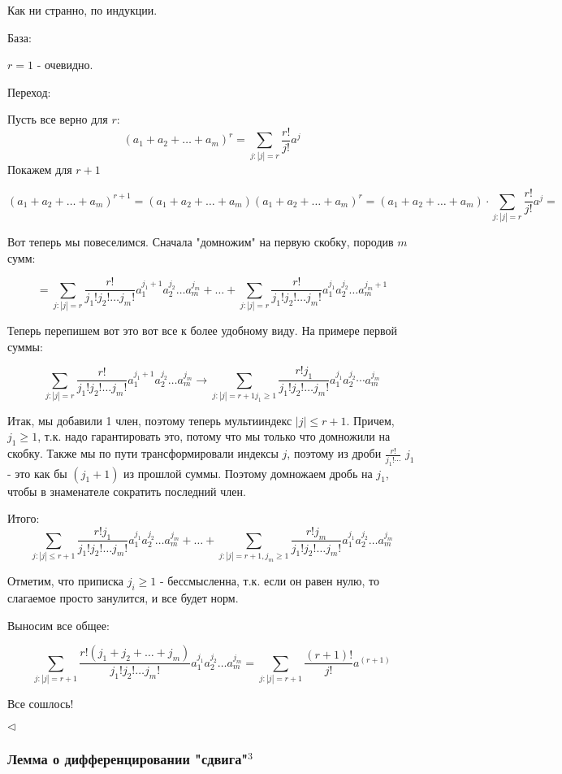 \documentclass{article}
\begin{document}
Как ни странно, по индукции.

База:

$r = 1$ - очевидно.

Переход:

Пусть все верно для $r$: 
$$
(a_1 + a_2 + \dots + a_m)^r = \sum_{j: |j| = r} \frac {r!}{j!} a^j
$$
Покажем для $r + 1$

$$
(a_1 + a_2 + \dots + a_m)^{r+1} = (a_1 + a_2 + \dots + a_m) (a_1 + a_2 + \dots + a_m)^r = (a_1 + a_2 + \dots + a_m) \cdot \sum_{j: |j| = r} \frac{r!}{j!} a^j = 
$$

Вот теперь мы повеселимся. Сначала "домножим" на первую скобку, породив $m$ сумм: 

$$
= \sum_{j: |j| = r} \frac{r!}{j_1!j_2!\dots j_m!} a^{j_1 + 1}_1 a^{j_2}_2 \dots a^{j_m}_m + \dots + \sum_{j: |j| = r} \frac{r!}{j_1!j_2!\dots j_m!} a^{j_1}_1 a^{j_2}_2\dots a^{j_m + 1}_m
$$

Теперь перепишем вот это вот все к более удобному виду. На примере первой суммы:

$$
\sum_{j: |j| = r} \frac{r!} {j_1!j_2!\dots j_m!} a^{j_1+1}_1 a^{j_2}_2 \dots a^{j_m}_m  \longrightarrow \sum_{j: |j| = r+1 j_1 \geq 1} \frac{r! j_1} {j_1! j_2! \dots j_m!} a^{j_1}_1 a^{j_2}_2 \cdots a^{j_m}_m
$$

Итак, мы добавили 1 член, поэтому теперь мультииндекс $|j| \leq r + 1$. Причем, $j_1 \geq 1$, т.к. надо гарантировать это, потому что мы только что домножили на скобку. Также мы по пути трансформировали индексы $j$, поэтому из дроби $\frac{r!}{j_1!\cdots}$ $j_1$ - это как бы $(j_1 + 1)$ из прошлой суммы. Поэтому домножаем дробь на $j_1$, чтобы в знаменателе сократить последний член. 

Итого:
$$
\sum_{j: |j| \leq r + 1} \frac{r! j_1} {j_1!j_2!\dots j_m!} a^{j_1}_1 a^{j_2}_2 \dots a^{j_m}_m + \dots + \sum_{j: |j| = r + 1, j_m \geq 1} \frac {r! j_m} {j_1! j_2! \dots j_m!} a^{j_1}_1 a^{j_2}_2 \dots a^{j_m}_m
$$

Отметим, что приписка $j_i \geq 1$ - бессмысленна, т.к. если он равен нулю, то слагаемое просто занулится, и все будет норм.

Выносим все общее:

$$
\sum_{j: |j| = r + 1} \frac {r! ( j_1 + j_2 + \dots + j_m)}{j_1! j_2! \dots j_m!} a_1^{j_1} a_2^{j_2} \dots a_m^{j_m} = \sum_{j: |j| = r + 1} \frac{(r+1)!}{j!} a^{(r + 1)}
$$

Все сошлось!

$\lhd$

\subsubsection{Лемма о дифференцировании "сдвига"\texorpdfstring{$^3$}{}}
\end{document}
